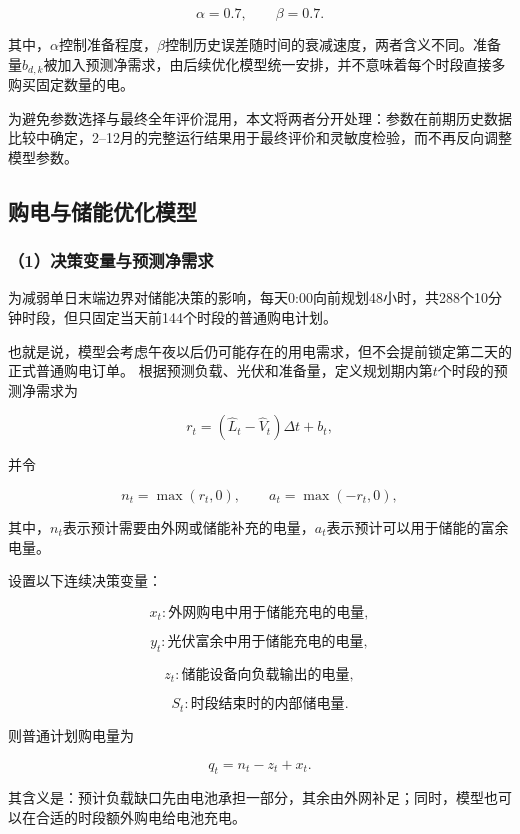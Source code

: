 \[
\alpha=0.7,\qquad \beta=0.7.
\]

其中，$\alpha$控制准备程度，$\beta$控制历史误差随时间的衰减速度，两者含义不同。准备量$b_{d,k}$被加入预测净需求，由后续优化模型统一安排，并不意味着每个时段直接多购买固定数量的电。

为避免参数选择与最终全年评价混用，本文将两者分开处理：参数在前期历史数据比较中确定，2--12月的完整运行结果用于最终评价和灵敏度检验，而不再反向调整模型参数。


\subsection{购电与储能优化模型}

\subsubsection*{（1）决策变量与预测净需求}

为减弱单日末端边界对储能决策的影响，每天0:00向前规划48小时，共288个10分钟时段，但只固定当天前144个时段的普通购电计划。

也就是说，模型会考虑午夜以后仍可能存在的用电需求，但不会提前锁定第二天的正式普通购电订单。
根据预测负载、光伏和准备量，定义规划期内第$t$个时段的预测净需求为

\begin{equation}
r_t
=
(\widehat L_t-\widehat V_t)\Delta t+b_t,
\label{eq:q2_net_demand}
\end{equation}

并令

\[
n_t=\max(r_t,0),
\qquad
a_t=\max(-r_t,0),
\]

其中，$n_t$表示预计需要由外网或储能补充的电量，$a_t$表示预计可以用于储能的富余电量。

设置以下连续决策变量：

\[
x_t:\text{外网购电中用于储能充电的电量},
\]

\[
y_t:\text{光伏富余中用于储能充电的电量},
\]

\[
z_t:\text{储能设备向负载输出的电量},
\]

\[
S_t:\text{时段结束时的内部储电量}.
\]

则普通计划购电量为

\begin{equation}
q_t=n_t-z_t+x_t.
\label{eq:q2_purchase}
\end{equation}

其含义是：预计负载缺口先由电池承担一部分，其余由外网补足；同时，模型也可以在合适的时段额外购电给电池充电。



